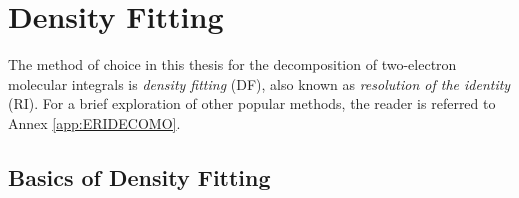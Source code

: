 



\FloatBarrier

\section{Density Fitting}

The method of choice in this thesis for the decomposition of two-electron molecular integrals is \emph{density fitting} (DF), also known as \emph{resolution of the identity} (RI). For a brief exploration of other popular methods, the reader is referred to Annex \ref{app:ERIDECOMO}.  

\subsection{Basics of Density Fitting}

